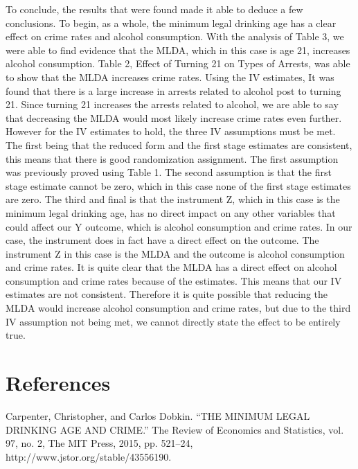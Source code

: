 \documentclass[a4paper]{article}
\begin{document}
\par
To conclude, the results that were found made it able to deduce a few conclusions. To begin, as a whole, the minimum legal drinking age has a clear effect on crime rates and alcohol consumption. With the analysis of Table 3, we were able to find evidence that the MLDA, which in this case is age 21, increases alcohol consumption. Table 2, Effect of Turning 21 on Types of Arrests, was able to show that the MLDA increases crime rates. Using the IV estimates, It was found that there is a large increase in arrests related to alcohol post to turning 21. Since turning 21 increases the arrests related to alcohol, we are able to say that decreasing the MLDA would most likely increase crime rates even further. However for the IV estimates to hold, the three IV assumptions must be met. The first being that the reduced form and the first stage estimates are consistent, this means that there is good randomization assignment. The first assumption was previously proved using Table 1. The second assumption is that the first stage estimate cannot be zero, which in this case none of the first stage estimates are zero. The third and final is that the instrument Z, which in this case is the minimum legal drinking age, has no direct impact on any other variables that could affect our Y outcome, which is alcohol consumption and crime rates. In our case, the instrument does in fact have a direct effect on the outcome. The instrument Z in this case is the MLDA and the outcome is alcohol consumption and crime rates. It is quite clear that the MLDA has a direct effect on alcohol consumption and crime rates because of the estimates. This means that our IV estimates are not consistent. Therefore it is quite possible that reducing the MLDA would increase alcohol consumption and crime rates, but due to the third IV assumption not being met, we cannot directly state the effect to be entirely true. 
\newpage
\section{References}
Carpenter, Christopher, and Carlos Dobkin. “THE MINIMUM LEGAL DRINKING AGE AND CRIME.” The Review of Economics and Statistics, vol. 97, no. 2, The MIT Press, 2015, pp. 521–24, http://www.jstor.org/stable/43556190.
\end{document}
